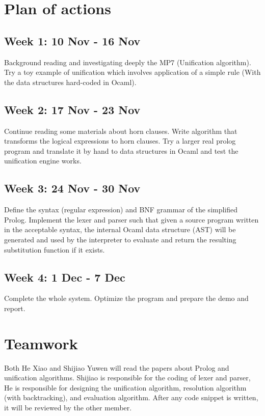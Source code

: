 \documentclass[11pt,a4paper]{report}
\begin{document}
	\section*{Plan of actions}
		\subsection*{Week 1: 10 Nov - 16 Nov} 
		Background reading and investigating deeply the MP7 (Unification algorithm). Try a toy example of unification which involves application of a simple rule (With the data structures hard-coded in Ocaml).
		
		\subsection*{Week 2: 17 Nov - 23 Nov} Continue reading some materials about horn clauses. Write algorithm that transforms the logical expressions to horn clauses. Try a larger real prolog program and translate it by hand to data structures in Ocaml and test the unification engine works.
		
		\subsection*{Week 3: 24 Nov - 30 Nov} Define the syntax (regular expression) and BNF grammar of the simplified Prolog. Implement the lexer and parser such that given a source program written in the acceptable syntax, the internal Ocaml data structure (AST) will be generated and used by the interpreter to evaluate and return the resulting substitution function if it exists.
		
		\subsection*{Week 4: 1 Dec - 7 Dec} Complete the whole system. Optimize the program and prepare the demo and report.
		
	\section*{Teamwork}
		Both He Xiao and Shijiao Yuwen will read the papers about Prolog and unification algorithms.
		Shijiao is responsible for the coding of lexer and parser, He is responsible for designing the unification algorithm, resolution algorithm (with backtracking), and evaluation algorithm. After any code snippet is written, it will be reviewed by the other member.
		
\end{document}

